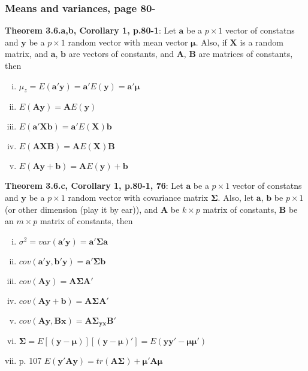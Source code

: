 \documentclass[]{article}
\begin{document}
\subsubsection{Means and variances, page 80-}
\textbf{Theorem 3.6.a,b, Corollary 1, p.80-1}: Let $\pmb{a}$ be a $p \times 1$ vector of constatns and $\pmb{y}$ be a $p \times 1$ random vector with mean vector $\pmb{\mu}$. Also, if $\pmb{X}$ is a random matrix, and $\pmb{a}$, $\pmb{b}$ are vectors of constants, and $\pmb{A}$, $\pmb{B}$ are matrices of constants, then
\begin{enumerate}[(i)]
	\item $\mu_z = E(\pmb{a}'\pmb{y}) = \pmb{a}'E(\pmb{y}) = \pmb{a}'\pmb{\mu}$
	\item $E(\pmb{A}\pmb{y}) = \pmb{A}E(\pmb{y})$
	\item $E(\pmb{a}'\pmb{Xb}) = \pmb{a}'E(\pmb{X})\pmb{b}$
	\item $E(\pmb{A}\pmb{XB}) = \pmb{A}E(\pmb{X})\pmb{B}$
	\item $E(\pmb{Ay} + \pmb{b}) = \pmb{A}E(\pmb{y}) + \pmb{b}$
\end{enumerate}

\textbf{Theorem 3.6.c, Corollary 1, p.80-1, 76}: Let $\pmb{a}$ be a $p \times 1$ vector of constatns and $\pmb{y}$ be a $p \times 1$ random vector with covariance matrix $\pmb{\Sigma}$. Also, let  $\pmb{a}$, $\pmb{b}$ be $p \times 1$ (or other dimension (play it by ear)), and $\pmb{A}$ be $k \times p$ matrix of constants, $\pmb{B}$ be an $m \times p$ matrix of constants, then
\begin{enumerate}[(i)]
	\item $\sigma^2 = var(\pmb{a}'\pmb{y}) = \pmb{a}'\pmb{\Sigma  a}$
	\item $cov(\pmb{a}'\pmb{y}, \pmb{b}'\pmb{y}) = \pmb{a}'\pmb{\Sigma  b}$
	\item $cov(\pmb{A}\pmb{y}) = \pmb{A}\pmb{\Sigma  A}'$
	\item $cov(\pmb{A}\pmb{y}+ \pmb{b}) = \pmb{A}\pmb{\Sigma  A}'$
	\item $cov(\pmb{Ay}, \pmb{Bx}) = \pmb{A}\pmb{\Sigma_{yx}  B}'$
	\item $\pmb{\Sigma} = E[(\pmb{y} - \pmb{\mu})][(\pmb{y} - \pmb{\mu})'] = E(\pmb{yy}' - \pmb{\mu\mu}')$
	\item p. 107 $E(\pmb{y}'\pmb{Ay}) = tr(\pmb{A\Sigma}) + \pmb{\mu}'\pmb{A\mu}$
\end{enumerate}
\end{document}
